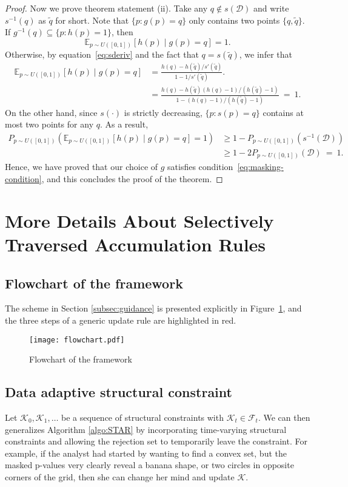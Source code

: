 \documentclass{biometrika}
\newcommand{\cF}{\mathcal{F}}
\newcommand{\cK}{\mathcal{K}}
\newcommand{\lb}{\left(}
\newcommand{\rb}{\right)}
\newcommand{\td}{\tilde}
\newcommand{\E}{\mathbb{E}}
\newcommand{\1}{\mathbf{1}}
\newcommand{\s}{s}
\begin{document}
\begin{proof}
Now we prove theorem statement (ii). Take any $q\not\in s(\mathcal{D})$ and write $s^{-1}(q)$ as $\td{q}$ for short. Note that $\{p: g(p) = q\}$ only contains two points $\{q, \td{q}\}$. If $g^{-1}(q)\subseteq \{p: h(p) = 1\}$, then 
\[\E_{p\sim U([0, 1])} [ h(p) \mid  g(p) = q] = 1.\]
Otherwise, by equation~\eqref{eq:sderiv} and the fact that $q = s(\td{q})$, we infer that 
\begin{align}
\E_{p\sim U([0, 1])} [ h(p) \mid  g(p) = q] &= \frac{h(q) - h(\td{q}) / \s'(\td{q})}{1 - 1 / \s'(\td{q})}.\nonumber\\
& = \frac{h(q) - h(\td{q}) (h(q) - 1) / (h(\td{q}) - 1)}{1 - (h(q) - 1) / (h(\td{q}) - 1)} ~=~ 1.\label{eq:ode_pre}
\end{align}
On the other hand, since $s(\cdot)$ is strictly decreasing, $\{p: s(p) = q\}$ contains at most two points for any $q$. As a result,
\begin{align*}
P_{p\sim U([0,1])}\lb \E_{p\sim U([0, 1])} [ h(p) \mid  g(p) = q] = 1\rb &\ge 1 - P_{p\sim U([0, 1])}\lb s^{-1}(\mathcal{D})\rb\\ &\ge 1 - 2P_{p\sim U([0, 1])}(\mathcal{D}) ~=~ 1.
\end{align*}
Hence, we have proved that our choice of $g$ satisfies condition~\eqref{eq:masking-condition}, and this concludes the proof of the theorem.
\end{proof}

\section{More Details About Selectively Traversed Accumulation Rules}\label{sec:star}
\subsection{Flowchart of the framework}\label{subapp:flowchart}
The scheme in Section \ref{subsec:guidance} is presented explicitly in Figure~\ref{fig:flowchart}, and the three steps of a generic update rule are highlighted in red.

\begin{figure}[h]
  \centering
  \texttt{[image: flowchart.pdf]}
  \caption{Flowchart of the framework}\label{fig:flowchart}
\end{figure}

\subsection{Data adaptive structural constraint}\label{subapp:Kt}
Let $\cK_{0}, \cK_{1}, \ldots$ be a sequence of structural constraints with $\cK_{t}\in \cF_{t}$. We can then generalizes Algorithm \ref{algo:STAR} by incorporating time-varying structural constraints and allowing the rejection set to temporarily leave the constraint. For example, if the analyst had started by wanting to find a convex set, but the masked p-values very clearly reveal a banana shape, or two circles in opposite corners of the grid, then she can change her mind and update $\cK$.
\end{document}
